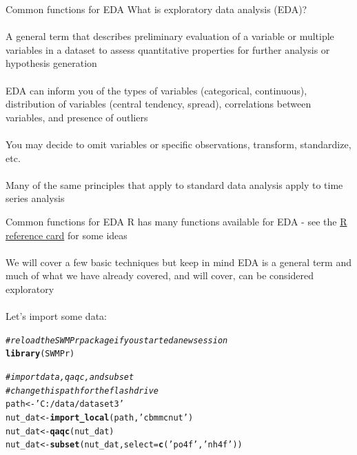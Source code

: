 \documentclass[xcolor=svgnames]{beamer}\usepackage[]{graphicx}\usepackage[]{color}
\makeatletter
\newcommand{\hlstr}[1]{\textcolor[rgb]{0.192,0.494,0.8}{#1}}%
\newcommand{\hlcom}[1]{\textcolor[rgb]{0.678,0.584,0.686}{\textit{#1}}}%
\newcommand{\hlstd}[1]{\textcolor[rgb]{0.345,0.345,0.345}{#1}}%
\newcommand{\hlkwb}[1]{\textcolor[rgb]{0.69,0.353,0.396}{#1}}%
\newcommand{\hlkwc}[1]{\textcolor[rgb]{0.333,0.667,0.333}{#1}}%
\newcommand{\hlkwd}[1]{\textcolor[rgb]{0.737,0.353,0.396}{\textbf{#1}}}%
\newenvironment{kframe}{%
 \def\at@end@of@kframe{}%
 \ifinner\ifhmode%
  \def\at@end@of@kframe{\end{minipage}}%
  \begin{minipage}{\columnwidth}%
 \fi\fi%
 \def\FrameCommand##1{\hskip\@totalleftmargin \hskip-\fboxsep
 \colorbox{shadecolor}{##1}\hskip-\fboxsep
     \hskip-\linewidth \hskip-\@totalleftmargin \hskip\columnwidth}%
 \MakeFramed {\advance\hsize-\width
   \@totalleftmargin\z@ \linewidth\hsize
   \@setminipage}}%
 {\par\unskip\endMakeFramed%
 \at@end@of@kframe}
\newenvironment{knitrout}{}{} %
\makeatother
\begin{document}
\begin{frame}{Common functions for EDA}
What is exploratory data analysis (EDA)? \\~\\
A general term that describes preliminary evaluation of a variable or multiple variables in a dataset to assess quantitative properties for further analysis or hypothesis generation\\~\\
EDA can inform you of the \alert{types} of variables (categorical, continuous), \alert{distribution} of variables (central tendency, spread), \alert{correlations} between variables, and presence of \alert{outliers} \\~\\
You may decide to omit variables or specific observations, transform, standardize, etc.\\~\\
Many of the same principles that apply to standard data analysis apply to time series analysis
\end{frame}

\begin{frame}[containsverbatim]{Common functions for EDA}
R has many functions available for EDA - see the \href{http://cran.r-project.org/doc/contrib/Short-refcard.pdf}{R reference card} for some ideas\\~\\
We will cover a few basic techniques but keep in mind EDA is a general term and much of what we have already covered, and will cover, can be considered exploratory \\~\\
Let's import some data:

\begin{knitrout}\scriptsize
{}\color{fgcolor}\begin{kframe}
\begin{alltt}
\hlcom{# reload the SWMPr package if you started a new session}
\hlkwd{library}\hlstd{(SWMPr)}

\hlcom{# import data, qaqc, and subset}
\hlcom{# change this path for the flash drive}
\hlstd{path} \hlkwb{<-} \hlstr{'C:/data/dataset3'}
\hlstd{nut_dat} \hlkwb{<-} \hlkwd{import_local}\hlstd{(path,} \hlstr{'cbmmcnut'}\hlstd{)}
\hlstd{nut_dat} \hlkwb{<-} \hlkwd{qaqc}\hlstd{(nut_dat)}
\hlstd{nut_dat} \hlkwb{<-} \hlkwd{subset}\hlstd{(nut_dat,} \hlkwc{select} \hlstd{=} \hlkwd{c}\hlstd{(}\hlstr{'po4f'}\hlstd{,} \hlstr{'nh4f'}\hlstd{))}
\end{alltt}
\end{kframe}
\end{knitrout}
\end{frame}
\end{document}
